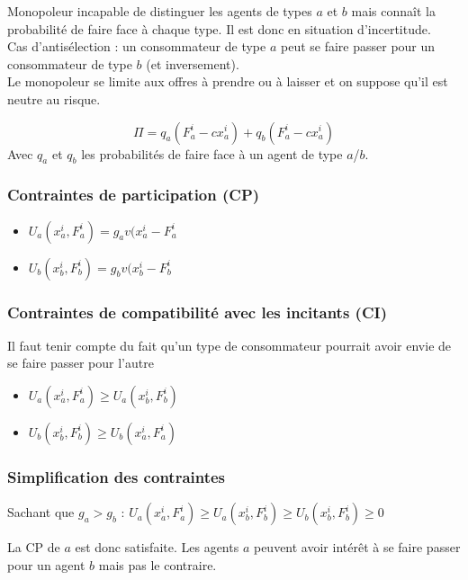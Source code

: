 Monopoleur incapable de distinguer les agents de types $a$ et $b$ mais connaît la probabilité de faire face à chaque type. Il est donc en situation d'incertitude.\\
\warning Cas d'antisélection : un consommateur de type $a$ peut se faire passer pour un consommateur de type $b$ (et inversement).\\
Le monopoleur se limite aux offres à prendre ou à laisser et on suppose qu'il est neutre au risque.

\begin{equation*}
\Pi = q_a(F^i_a - c x^i_a) + q_b(F^i_a - c x^i_a)
\end{equation*}
Avec $q_a$ et $q_b$ les probabilités de faire face à un agent de type $a$/$b$.

\subsubsection{Contraintes de participation (CP)}

\begin{itemize}
\item $U_a(x^i_a, F^i_a) = g_a v(x^i_a - F^i_a$
\item $U_b(x^i_b, F^i_b) = g_b v(x^i_b - F^i_b$
\end{itemize}

\subsubsection{Contraintes de compatibilité avec les incitants (CI)}

Il faut tenir compte du fait qu'un type de consommateur pourrait avoir envie de se faire passer pour l'autre
\begin{itemize}
\item $U_a(x^i_a, F^i_a) \geq U_a(x^i_b, F^i_b)$
\item $U_b(x^i_b, F^i_b) \geq U_b(x^i_a, F^i_a)$
\end{itemize}

\subsubsection{Simplification des contraintes}

Sachant que $g_a > g_b$ : $U_a(x^i_a, F^i_a) \geq U_a(x^i_b, F^i_b) \geq U_b(x^i_b, F^i_b) \geq 0$

La CP de $a$ est donc satisfaite. Les agents $a$ peuvent avoir intérêt à se faire passer pour un agent $b$ mais pas le contraire.


